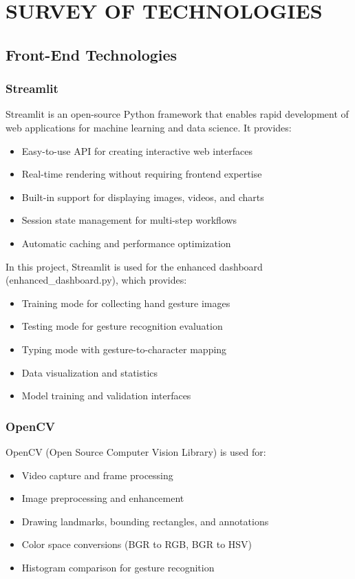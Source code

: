 \chapter{SURVEY OF TECHNOLOGIES}

\section{Front-End Technologies}

\subsection{Streamlit}

Streamlit is an open-source Python framework that enables rapid development of web applications for machine learning and data science. It provides:
\begin{itemize}
    \item Easy-to-use API for creating interactive web interfaces
    \item Real-time rendering without requiring frontend expertise
    \item Built-in support for displaying images, videos, and charts
    \item Session state management for multi-step workflows
    \item Automatic caching and performance optimization
\end{itemize}

In this project, Streamlit is used for the enhanced dashboard (enhanced\_dashboard.py), which provides:
\begin{itemize}
    \item Training mode for collecting hand gesture images
    \item Testing mode for gesture recognition evaluation
    \item Typing mode with gesture-to-character mapping
    \item Data visualization and statistics
    \item Model training and validation interfaces
\end{itemize}

\subsection{OpenCV}

OpenCV (Open Source Computer Vision Library) is used for:
\begin{itemize}
    \item Video capture and frame processing
    \item Image preprocessing and enhancement
    \item Drawing landmarks, bounding rectangles, and annotations
    \item Color space conversions (BGR to RGB, BGR to HSV)
    \item Histogram comparison for gesture recognition
\end{itemize}

